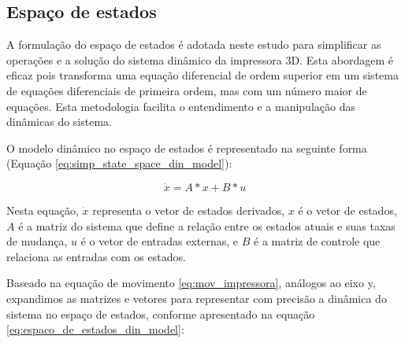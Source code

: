 \subsection{Espaço de estados}

A formulação do espaço de estados é adotada neste estudo para simplificar as operações e a solução do sistema dinâmico da impressora 3D. Esta abordagem é eficaz pois transforma uma equação diferencial de ordem superior em um sistema de equações diferenciais de primeira ordem, mas com um número maior de equações. Esta metodologia facilita o entendimento e a manipulação das dinâmicas do sistema.

O modelo dinâmico no espaço de estados é representado na seguinte forma (Equação \ref{eq:simp_state_space_din_model}):

\begin{equation}
    \label{eq:simp_state_space_din_model}
    \dot x = A*x+B*u
\end{equation}

Nesta equação, \(\dot x\) representa o vetor de estados derivados, \(x\) é o vetor de estados, \(A\) é a matriz do sistema que define a relação entre os estados atuais e suas taxas de mudança, \(u\) é o vetor de entradas externas, e \(B\) é a matriz de controle que relaciona as entradas com os estados.

Baseado na equação de movimento \ref{eq:mov_impressora}, análogos ao eixo y, expandimos as matrizes e vetores para representar com precisão a dinâmica do sistema no espaço de estados, conforme apresentado na equação \ref{eq:espaco_de_estados_din_model}:

